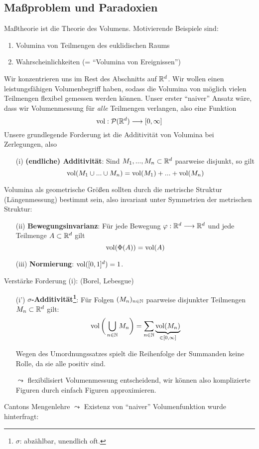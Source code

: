 \subsection{Maßproblem und Paradoxien}
Maßtheorie ist die Theorie des Volumens. Motivierende Beispiele sind:
\begin{enumerate}[label=\roman*),topsep=3pt, itemsep=0pt]
\item Volumina von Teilmengen des euklidischen Raums
\item Wahrscheinlichkeiten (= ``Volumina von Ereignissen'')
\end{enumerate}
Wir konzentrieren uns im Rest des Abschnitts auf $\mathbb{R}^d$. Wir wollen einen leistungsfähigen Volumenbegriff haben, sodass die Volumina von möglich vielen Teilmengen flexibel gemessen werden können. Unser erster ``naiver'' Ansatz wäre, dass wir Volumenmessung für \emph{alle} Teilmengen verlangen, also eine Funktion
\begin{equation*}
 \operatorname{vol}: \mathcal{P}(\mathbb{R}^d) \longrightarrow [0,\infty]
\end{equation*}
Unsere grundlegende Forderung ist die Additivität von Volumina bei Zerlegungen, also
\begin{enumerate}
\item[(i)] \textbf{(endliche) Additivität}: Sind $M_1,...,M_n\subset \mathbb{R}^d$ paarweise disjunkt, so gilt
\begin{equation*}
\operatorname{vol} (M_1\cup ... \cup M_n) = \operatorname{vol}(M_1)+...+\operatorname{vol} (M_n)
\end{equation*}
\end{enumerate}
Volumina als geometrische Größen sollten durch die metrische Struktur (Längenmessung) bestimmt sein, also invariant unter Symmetrien der metrischen Struktur:
\begin{enumerate}
\item[(ii)] \textbf{Bewegungsinvarianz}: Für jede Bewegung $\varphi: \mathbb{R}^d \longrightarrow \mathbb{R}^d$ und jede Teilmenge $A\subset \mathbb{R}^d$ gilt
\begin{equation*}
\operatorname{vol}(\Phi(A)) = \operatorname{vol} (A)
\end{equation*}
\item[(iii)] \textbf{Normierung}: $\operatorname{vol}([0,1]^d)=1$.
\end{enumerate}
Verstärke Forderung (i): (Borel, Lebesgue)
\begin{enumerate}
\item[(i')]\textbf{$\sigma$-Additivität\footnote{$\sigma$: abzählbar, unendlich oft.}}: Für Folgen $(M_n)_{n\in \mathbb{N}}$ paarweise disjunkter Teilmengen $M_n \subset \mathbb{R}^d$ gilt:
\begin{equation*}
\operatorname{vol}\bigg( \bigcup_{n\in \mathbb{N}} M_n \bigg) = \sum_{n\in \mathbb{N}} \underbrace{\operatorname{vol} (M_n)}_{\in [0,\infty]} 
\end{equation*}
\begin{remark}
Wegen des Umordnungssatzes spielt die Reihenfolge der Summanden keine Rolle, da sie alle positiv sind.
\end{remark}
$\leadsto$ flexibilisiert Volumenmessung entscheidend, wir können also komplizierte Figuren durch einfach Figuren approximieren.
\end{enumerate}
Cantons Mengenlehre $\leadsto$ Existenz von ``naiver'' Volumenfunktion wurde hinterfragt: %
